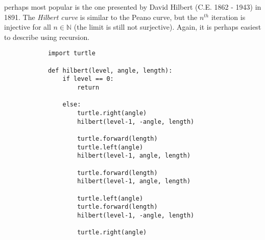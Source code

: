 \documentclass{article}
\theoremstyle{plain}
\theoremstyle{normal}
\begin{document}
        perhaps most popular is the one presented by
        David Hilbert (C.E. 1862 - 1943) in 1891. The
        \textit{Hilbert curve}
        is similar to the Peano curve, but the $n^{th}$ iteration is injective
        for all $n\in\mathbb{N}$ (the limit is still not surjective). Again,
        it is perhaps easiest to describe using recursion.
        \begin{verbatim}
            import turtle

            def hilbert(level, angle, length):
                if level == 0:
                    return

                else:
                    turtle.right(angle)
                    hilbert(level-1, -angle, length)
             
                    turtle.forward(length)
                    turtle.left(angle)
                    hilbert(level-1, angle, length)
             
                    turtle.forward(length)
                    hilbert(level-1, angle, length)

                    turtle.left(angle)
                    turtle.forward(length)
                    hilbert(level-1, -angle, length)

                    turtle.right(angle)
        \end{verbatim}
    \printindex
\end{document}
